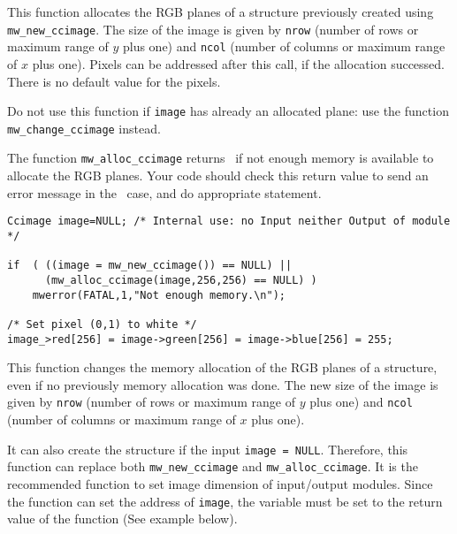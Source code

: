 \Description
This function allocates the RGB planes of a \ccimage structure previously
created using \verb+mw_new_ccimage+. The size of the image is given by 
\verb+nrow+ (number of rows or maximum range of $y$ plus one) and \verb+ncol+
(number of columns or maximum range of $x$ plus one).
Pixels can be addressed after this call, if the allocation successed. There is
no default value for the pixels.

Do not use this function if \verb+image+ has already an allocated plane: use
the function \verb+mw_change_ccimage+ instead.

The function \verb+mw_alloc_ccimage+ returns \Null\ if not enough memory is available to allocate the RGB planes. Your code should check this return value to 
send an error message in the \Null\ case, and do appropriate statement.

\Next
\Example
\begin{verbatim}
Ccimage image=NULL; /* Internal use: no Input neither Output of module */

if  ( ((image = mw_new_ccimage()) == NULL) ||
      (mw_alloc_ccimage(image,256,256) == NULL) )
    mwerror(FATAL,1,"Not enough memory.\n");

/* Set pixel (0,1) to white */
image_>red[256] = image->green[256] = image->blue[256] = 255;
\end{verbatim}

\newpage %
\Description
This function changes the memory allocation of the RGB planes of a \ccimage
structure, even if no previously memory allocation was done.
The new size of the image is given by \verb+nrow+ (number of rows or maximum 
range of $y$ plus one) and \verb+ncol+ (number of columns or maximum range of 
$x$ plus one). 

It can also create the structure if the input \verb+image = NULL+.
Therefore, this function can replace both \verb+mw_new_ccimage+ and
\verb+mw_alloc_ccimage+. It is the recommended function to set image 
dimension of input/output modules. 
Since the function can set the address of \verb+image+, the variable must be set to the return value of the function (See example below).

